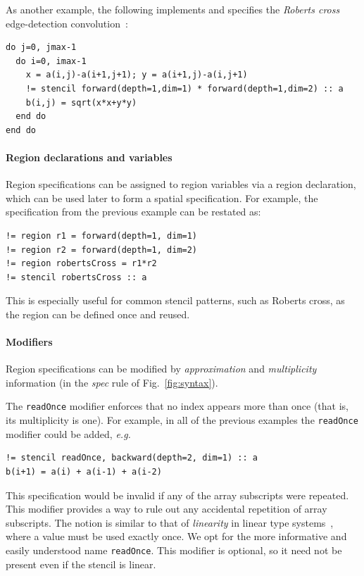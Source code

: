\documentclass[9pt,preprint]{sigplanconf}
\theoremstyle{definition}
\newcommand{\eg}{\emph{e.g.}}
\begin{document}
As another example, the following
implements and specifies the \emph{Roberts cross}
edge-detection convolution~\cite{davis1975survey}:
\begin{verbatim}
do j=0, jmax-1
  do i=0, imax-1
    x = a(i,j)-a(i+1,j+1); y = a(i+1,j)-a(i,j+1)
    != stencil forward(depth=1,dim=1) * forward(depth=1,dim=2) :: a
    b(i,j) = sqrt(x*x+y*y)
  end do
end do
\end{verbatim}

\paragraph{Region declarations and variables}

Region specifications can be assigned to region variables via
a region declaration, which can be used later to form a spatial
specification. For example, the specification from the previous
 example can be restated as:
\begin{verbatim}
!= region r1 = forward(depth=1, dim=1)
!= region r2 = forward(depth=1, dim=2)
!= region robertsCross = r1*r2
!= stencil robertsCross :: a
\end{verbatim}
This is especially useful for common stencil patterns, such as Roberts cross,
as the region can be defined once and reused.
\paragraph{Modifiers}
Region specifications can be modified 
by \emph{approximation} and \emph{multiplicity} information 
(in the \textit{spec} rule of Fig.~\ref{fig:syntax}). 

The \texttt{readOnce} modifier enforces that no index appears more
than once (that is, its multiplicity is one). For example, in all of
the previous examples the \texttt{readOnce} modifier could be added,
\eg{}
%
\begin{verbatim}
!= stencil readOnce, backward(depth=2, dim=1) :: a
b(i+1) = a(i) + a(i-1) + a(i-2)
\end{verbatim}
%
This specification would be invalid if any of the
array subscripts were repeated. This modifier provides a way to
rule out any accidental repetition of array subscripts.
The notion is similar to that of \emph{linearity} in linear type
systems~\cite{wadler1990linear}, where a value must be used
exactly once. We opt for the more informative and easily understood name
\texttt{readOnce}. This modifier is optional, so it need not
be present even if the stencil is linear.
\end{document}
